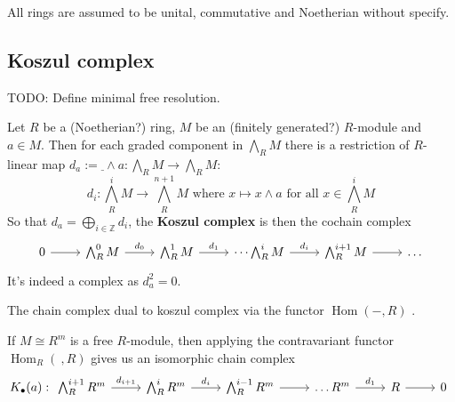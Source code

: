All rings are assumed to be unital, commutative and Noetherian without specify.

\subsection{Koszul complex}

\begin{definition}
	\label{def:minimal_free_resl}
	TODO: Define minimal free resolution.
\end{definition}


\begin{proposition}
	\label{prop:loc_resl_min_iff_basis_to_gen}
\end{proposition}


\begin{definition}[KoszulComplex]
	\label{def:KoszulComplex}
	\leanok
	Let $R$ be a (Noetherian?) ring, $M$ be an (finitely generated?) $R$-module and $a \in M$.
	Then for each graded component in $\bigwedge_R M$ there is a restriction of $R$-linear map $d_a := \underline{\ } \wedge a: \bigwedge_R M \to \bigwedge_R M$:
	$$d_i: \bigwedge_R^i M \to \bigwedge_R^{n+1}M \text{ where } x \mapsto x \wedge a \text{ for all } x \in \bigwedge_{R}^i M$$
	So that $d_a = \bigoplus_{i \in \mathbb{Z}}d_i$, the \textbf{Koszul complex} is then the cochain complex
	$$\begin{tikzcd}
		0 \arrow[r] & \bigwedge^{0}_R M \arrow[r, "d_{0}"] & \bigwedge^1_R M \arrow[r, "d_1"] & \dots \bigwedge_R^i M\arrow[r, "d_i"] & \bigwedge_R^{i+1} M \arrow[r] & \dots
	\end{tikzcd}$$
	It's indeed a complex as $d_a^2 = 0$.
\end{definition}

\begin{definition}
	\label{def:DualKoszulComplex}
	\leanok
	The chain complex dual to koszul complex via the functor $\operatorname{Hom}(-,R)$ .
\end{definition}

\begin{proposition}
	\label{prop:free_koszul_is_iso_to_dual}
	If $M \cong R^m$ is a free $R$-module, then applying the contravariant functor $\operatorname{Hom}_R(\ , R)$ gives us an isomorphic chain complex 
	$$K_{\bullet}(a) :\begin{tikzcd}
	\bigwedge^{i+1}_R R^m \arrow[r, "d_{i+1}"] & \bigwedge^i_R R^m \arrow[r, "d_i"] & \bigwedge^{i-1}_R R^m \arrow[r] & \dots R^m \arrow[r, "d_1"] & R \arrow[r] & 0
	\end{tikzcd}$$
\end{proposition}

